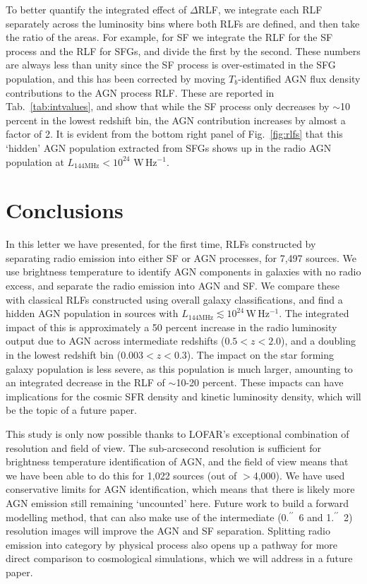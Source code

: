 \documentclass[usenatbib,fleqn,letters]{mnras}
\newcommand{\sarc}{$^{\prime\prime}\!\!$}
\newcommand{\wphz}{$\,$W$\,$Hz$^{-1}$}
\newcommand{\llof}{$L_{\textrm{144MHz}}$}
\begin{document}
To better quantify the integrated effect of $\Delta$RLF, we integrate each RLF separately across the luminosity bins where both RLFs are defined, and then take the ratio of the areas. For example, for SF we integrate the RLF for the SF process and the RLF for SFGs, and divide the first by the second. These numbers are always less than unity since the SF process is over-estimated in the SFG population, and this has been corrected by moving $T_b$-identified AGN flux density contributions to the AGN process RLF. These are reported in Tab.~\ref{tab:intvalues}, and show that while the SF process  only decreases by $\sim$10 percent in the lowest redshift bin, the AGN contribution increases by almost a factor of 2. It is evident from the bottom right panel of Fig.~\ref{fig:rlfs} that this `hidden' AGN population extracted from SFGs shows up in the radio AGN population at $L_{\textrm{144MHz}} < 10^{24}\,$\wphz .


\section{Conclusions}
\label{sec:conclusions}

In this letter we have presented, for the first time, RLFs constructed by separating radio emission into either SF or AGN processes, for 7,497 sources. We use brightness temperature to identify AGN components in galaxies with no radio excess, and separate the radio emission into AGN and SF. We compare these with classical RLFs constructed using overall galaxy classifications, and find a hidden AGN population in sources with \llof $\lesssim 10^{24}$\wphz . The integrated impact of this is approximately a 50 percent increase in the radio luminosity output due to AGN across intermediate redshifts ($0.5 < z < 2.0$), and a doubling in the lowest redshift bin ($0.003 < z < 0.3$). The impact on the star forming galaxy population is less severe, as this population is much larger, amounting to an integrated decrease in the RLF of $\sim$10-20 percent. These impacts can have implications for the cosmic SFR density and kinetic luminosity density, which will be the topic of a future paper. 

This study is only now possible thanks to LOFAR's exceptional combination of resolution and field of view. The sub-arcsecond resolution is sufficient for brightness temperature identification of AGN, and the field of view means that we have been able to do this for 1,022 sources (out of $>$4,000). We have used conservative limits for AGN identification, which means that there is likely more AGN emission still remaining `uncounted' here. Future work to build a forward modelling method, that can also make use of the intermediate (0.\sarc\ 6 and 1.\sarc\ 2) resolution images will improve the AGN and SF separation. Splitting radio emission into category by physical process also opens up a pathway for more direct comparison to cosmological simulations, which we will address in a future paper.
\end{document}
